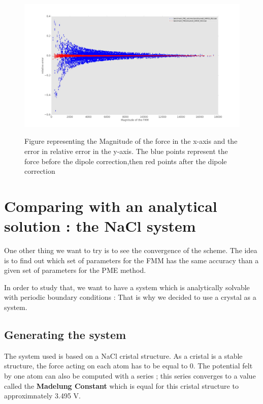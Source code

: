 \documentclass[11pt,twoside,a4paper]{report}
\begin{document}
\begin{figure}[H]
	   \includegraphics[scale=0.2]{magErr_Correction}
	    \label{fig:magnitude}
    \centering 
    \caption{Figure representing the Magnitude of the force in the x-axis and the  error in relative error in the y-axis. The blue points represent the force before the dipole correction,then red points after the dipole correction}    
    
    \label{fig:magnitude}
   \end{figure}  
   
\section{Comparing with an analytical solution : the NaCl system}

One other thing we want to try is to see the convergence of the scheme. The idea is to find out which set of parameters for the FMM has the same accuracy than a given set of parameters for the PME method. 

In order to study that, we want to have a system which is analytically solvable with periodic boundary conditions : That is why we decided to use a crystal as a system. 

\subsection{Generating the system}

The system used is based on a NaCl cristal structure. As a cristal is a stable structure, the force acting on each atom has to be equal to 0. The potential felt by one atom can also be computed with a series ; this series converges to a value called the \textbf{Madelung Constant} which is equal for this cristal structure to approximnately 3.495 V.
\end{document}
